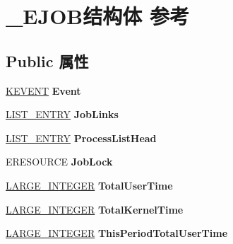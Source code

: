 \hypertarget{struct___e_j_o_b}{}\section{\+\_\+\+E\+J\+O\+B结构体 参考}
\label{struct___e_j_o_b}
\subsection*{Public 属性}
\begin{DoxyCompactItemize}
\item 
\mbox{\label{struct___e_j_o_b_a5113d3c666b6732e0bde42749f06fe53}} 
\hyperlink{struct___k_e_v_e_n_t}{K\+E\+V\+E\+NT} {\bfseries Event}
\item 
\mbox{\label{struct___e_j_o_b_a7cf5cb425b104d1a457fe7a769095609}} 
\hyperlink{struct___l_i_s_t___e_n_t_r_y}{L\+I\+S\+T\+\_\+\+E\+N\+T\+RY} {\bfseries Job\+Links}
\item 
\mbox{\label{struct___e_j_o_b_a2a7523ed821cf90bef1077a3dcd82e71}} 
\hyperlink{struct___l_i_s_t___e_n_t_r_y}{L\+I\+S\+T\+\_\+\+E\+N\+T\+RY} {\bfseries Process\+List\+Head}
\item 
\mbox{\label{struct___e_j_o_b_aea1e9583b0da4fda1bf5dad2d7072af5}} 
E\+R\+E\+S\+O\+U\+R\+CE {\bfseries Job\+Lock}
\item 
\mbox{\label{struct___e_j_o_b_a9852b2a205e04a2a1708be22962446ef}} 
\hyperlink{union___l_a_r_g_e___i_n_t_e_g_e_r}{L\+A\+R\+G\+E\+\_\+\+I\+N\+T\+E\+G\+ER} {\bfseries Total\+User\+Time}
\item 
\mbox{\label{struct___e_j_o_b_a0824e007bf2c01e0c62739fa3576599a}} 
\hyperlink{union___l_a_r_g_e___i_n_t_e_g_e_r}{L\+A\+R\+G\+E\+\_\+\+I\+N\+T\+E\+G\+ER} {\bfseries Total\+Kernel\+Time}
\item 
\mbox{\label{struct___e_j_o_b_a010df93776aeb5560399cfc1902c8728}} 
\hyperlink{union___l_a_r_g_e___i_n_t_e_g_e_r}{L\+A\+R\+G\+E\+\_\+\+I\+N\+T\+E\+G\+ER} {\bfseries This\+Period\+Total\+User\+Time}
\item 
\mbox{\label{struct___e_j_o_b_aa27515b00f0869874fadba567920357c}} 

\end{DoxyCompactItemize}
